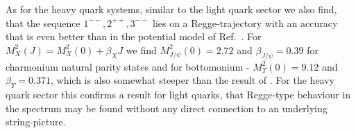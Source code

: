 As for the heavy quark systems, similar to the light quark sector we also find, that the 
sequence $1^{--}, 2^{++}, 3^{--}$ lies on a Regge-trajectory with an accuracy that is
even better than in the potential model of Ref.~\cite{Ebert:2011jc}. 
For $M^2_X(J) = M^2_X(0) + \beta_X J$ we find $M^2_{J/\psi}(0) = 2.72$ and $\beta_{J/\psi} = 0.39$ for charmonium natural parity states and
for bottomonium - $M^2_{\Upsilon}(0) = 9.12$ and $\beta_{\Upsilon} = 0.371$, which 
is also somewhat steeper than the result of \cite{Ebert:2011jc}. For the heavy quark 
sector this confirms a result for light quarks, that Regge-type behaviour in the spectrum may be 
found without any direct connection to an underlying string-picture.
%
%
%
%
%
%
